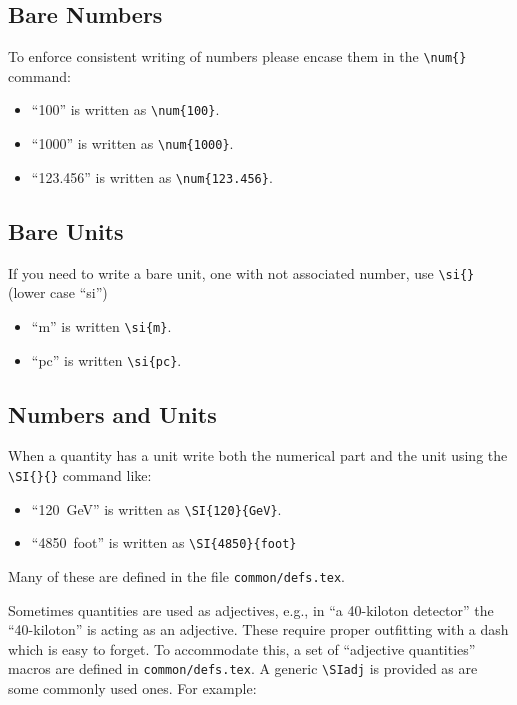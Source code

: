 \subsection{Bare Numbers}

To enforce consistent writing of numbers please encase them in the
\verb|\num{}| command:

\begin{itemize}
\item ``\num{100}'' is written as \verb|\num{100}|.
\item ``\num{1000}'' is written as \verb|\num{1000}|.
\item ``\num{123.456}'' is written as \verb|\num{123.456}|.
\end{itemize}

\subsection{Bare Units}

If you need to write a bare unit, one with not associated number, use
\verb|\si{}| (lower case ``si'')

\begin{itemize}
\item ``\si{m}'' is written \verb|\si{m}|.
\item ``\si{pc}'' is written \verb|\si{pc}|.
\end{itemize}

\subsection{Numbers and Units}

When a quantity has a unit write both the numerical part and the unit
using the \verb|\SI{}{}| command like:

\begin{itemize}
\item ``\SI{120}{GeV}'' is written as \verb|\SI{120}{GeV}|.
\item ``\SI{4850}{foot}'' is written as \verb|\SI{4850}{foot}|
\end{itemize}

Many of these are defined in the file \texttt{common/defs.tex}.

Sometimes quantities are used as adjectives, e.g., in ``a 40-kiloton detector'' the ``40-kiloton'' is acting as an adjective.
These require proper outfitting with a dash which is easy to forget.
To accommodate this, a set of ``adjective quantities'' macros are defined in \texttt{common/defs.tex}.
A generic \verb|\SIadj| is provided as are some commonly used ones.
For example:


